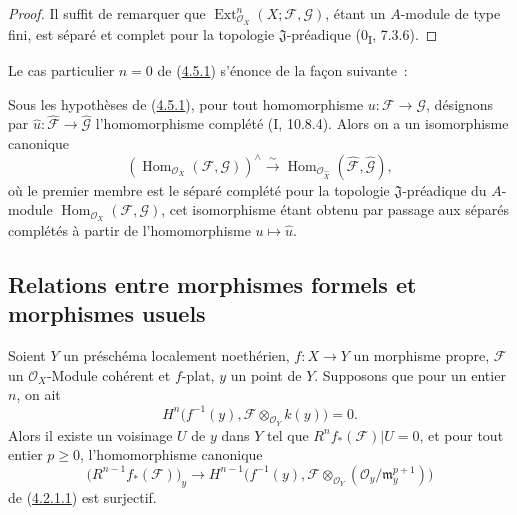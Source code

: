 \begin{proof}
Il suffit de remarquer que $\operatorname{Ext}^n_{\mathcal O_X}
(X;\mathcal F,\mathcal G)$, étant un $A$-module de type fini, est séparé et
complet pour la topologie $\mathfrak J$-préadique (0\textsubscript{I}, 7.3.6).
\end{proof}

Le cas particulier $n=0$ de (\hyperref[III.4.5.1-fr]{4.5.1}) s'énonce de la
façon suivante~:

\begin{corollary}[4.5.3]
\label{III.4.5.3-fr}
Sous les hypothèses de (\hyperref[III.4.5.1-fr]{4.5.1}), pour tout
homomorphisme $u:\mathcal F\to\mathcal G$, désignons par
$\widehat u:\widehat{\mathcal F}\to\widehat{\mathcal G}$ l'homomorphisme
complété (I, 10.8.4). Alors on a un isomorphisme canonique
\[
\label{III.4.5.3.1-fr}
\left(\operatorname{Hom}_{\mathcal O_X}(\mathcal F,\mathcal G)\right)^\wedge
\xrightarrow{\sim}
\operatorname{Hom}_{\mathcal O_{\widehat X}}
(\widehat{\mathcal F},\widehat{\mathcal G}),
\tag{4.5.3.1}
\]
où le premier membre est le séparé complété pour la topologie
$\mathfrak J$-préadique du $A$-module
$\operatorname{Hom}_{\mathcal O_X}(\mathcal F,\mathcal G)$, cet isomorphisme étant obtenu
par passage aux séparés complétés à partir de l'homomorphisme
$u\mapsto\widehat u$.
\end{corollary}

\subsection{Relations entre morphismes formels et morphismes usuels}

\begin{proposition}[4.6.1]
\label{III.4.6.1-fr}
Soient $Y$ un préschéma localement noethérien, $f:X\to Y$ un morphisme
propre, $\mathcal F$ un $\mathcal O_X$-Module cohérent et $f$-plat, $y$ un
point de $Y$. Supposons que pour un entier $n$, on ait
\[
H^n\bigl(f^{-1}(y),\mathcal F\otimes_{\mathcal O_Y}k(y)\bigr)=0.
\]
Alors il existe un voisinage $U$ de $y$ dans $Y$ tel que
$R^nf_*(\mathcal F)|U=0$, et pour tout entier $p\geq0$, l'homomorphisme
canonique
\[
\bigl(R^{n-1}f_*(\mathcal F)\bigr)_y
\longrightarrow
H^{n-1}\bigl(f^{-1}(y),
\mathcal F\otimes_{\mathcal O_Y}
(\mathcal O_y/\mathfrak m_y^{p+1})\bigr)
\]
de (\hyperref[III.4.2.1.1-fr]{4.2.1.1}) est surjectif.
\end{proposition}


